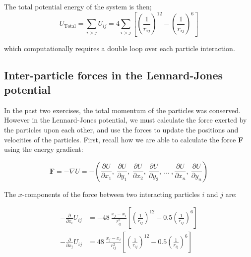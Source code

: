 \documentclass{article}
\begin{document}
The total potential energy of the system is then;
\begin{equation}
    U_{\mathrm{Total}}
    = \sum_{i>j} U_{ij}
    = 4 \sum_{i>j} \left[ \left(\frac{1}{r_{ij}} \right)^{12} - \left(\frac{1}{r_{ij}} \right)^6 \right] \label{eq:total_energy}
\end{equation}

which computationally requires a double loop over each particle interaction.


% 

\subsection{Inter-particle forces in the Lennard-Jones potential}

In the past two exercises, the total momentum of the particles was conserved.
However in the Lennard-Jones potential, we must calculate the force exerted by the particles upon each other, and use the forces to update the positions and velocities of the particles.
First, recall how we are able to calculate the force \textbf{F} using the energy gradient:

\begin{equation}
    \mathbf{F} = -\nabla U = -\left( \frac{\partial U}{\partial x_1},\ \frac{\partial U}{\partial y_1},\  \frac{\partial U}{\partial x_2},\ \frac{\partial U}{\partial y_2},\ \ldots\ ,\frac{\partial U}{\partial x_n},\ \frac{\partial U}{\partial y_n}\right)
    \label{eq:force}
\end{equation}

The $x$-components of the force between two interacting particles $i$ and $j$ are:

\begin{align}
    -\frac{\partial}{\partial x_i} U_{ij} &= -48\ \frac{x_j - x_i}{r^2_{ij}}\left[ \left(\frac{1}{r_{ij}} \right)^{12} - 0.5 \left(\frac{1}{r_{ij}} \right)^6 \right] \\
    -\frac{\partial}{\partial x_j} U_{ij} &=  48\ \frac{x_j - x_i}{r^2_{ij}}\left[ \left(\frac{1}{r_{ij}} \right)^{12} - 0.5 \left(\frac{1}{r_{ij}} \right)^6 \right]
\end{align}
\end{document}
